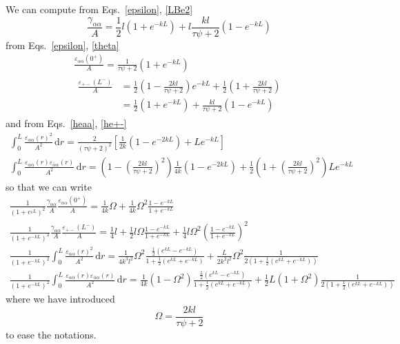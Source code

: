 \documentclass[pre,aps,superscriptaddress,nofootinbib]{revtex4}
\begin{document}
We can compute from Eqs.~\ref{epsilon}, \ref{LBe2}
\begin{equation}
\frac{\gamma_{\alpha\alpha}}{A} = \frac{1}{2} l (1 + e^{-k L}) + l \frac{kl}{\tau\psi + 2} (1 - e^{-kL})
\end{equation}
from Eqs.~\ref{epsilon}, \ref{theta}
\begin{eqnarray}
\frac{\varepsilon_{\alpha\alpha}(0^+)}{A} = \frac{1}{\tau\psi + 2}(1 + e^{-k L})\\
\begin{aligned}
\frac{\varepsilon_{+-}(L^-)}{A} &= \frac{1}{2} \left(1 - \frac{2 k l}{\tau \psi + 2}\right)e^{-k L} + \frac{1}{2} \left(1 + \frac{2 k l}{\tau \psi + 2}\right)\\
&= \frac{1}{2} (1 + e^{-k L}) + \frac{k l}{\tau \psi + 2} (1 - e^{- k L})
\end{aligned}
\end{eqnarray}
and from Eqs.~\ref{heaa}, \ref{he+-}
\begin{eqnarray}
\int_0^L \frac{\varepsilon_{\alpha\alpha}(r)^2}{A^2} \, \mathrm{d}r = \frac{2}{(\tau \psi + 2)^2} \left[\frac{1}{2k}(1 - e^{- 2 k L}) + L e^{-k L}\right]\\
\int_0^L \frac{\varepsilon_{\alpha\overline{\alpha}}(r)\varepsilon_{\overline{\alpha}\alpha}(r)}{A^2} \, \mathrm{d}r = \left(1 - \left(\frac{2 k l}{\tau \psi + 2}\right)^2\right) \frac{1}{4 k} (1 - e^{-2 k L}) + \frac{1}{2} \left(1 + \left(\frac{2 k l}{\tau \psi + 2}\right)^2\right) L e^{-k L}
\end{eqnarray}
so that we can write
\begin{eqnarray}
\frac{1}{(1 + e^{_k L})^2} \frac{\gamma_{\alpha\alpha}}{A} \frac{\varepsilon_{\alpha\alpha}(0^+)}{A} = \frac{1}{4 k} \Omega + \frac{1}{4 k} \Omega^2 \frac{1 - e^{-k L}}{1 + e^{-k L}}\\
\frac{1}{(1 + e^{-k L})^2} \frac{\gamma_{\alpha\alpha}}{A} \frac{\varepsilon_{+-}(L^-)}{A} = \frac{1}{4} l + \frac{1}{2} l \Omega \frac{1 - e^{-k L}}{1 + e^{-k L}} + \frac{1}{4} l \Omega^2 \left(\frac{1 - e^{-k L}}{1 + e^{-k L}}\right)^2\\
\frac{1}{(1 + e^{-k L})^2} \int_0^L \frac{\varepsilon_{\alpha\alpha}(r)^2}{A^2} \, \mathrm{d}r = \frac{1}{4 k^3 l^2} \Omega^2 \frac{\frac{1}{2}(e^{k L} - e^{-k L})}{1 + \frac{1}{2} (e^{k L} + e^{-k L})} + \frac{L}{2 k^2 l^2} \Omega^2 \frac{1}{2\left(1 + \frac{1}{2}(e^{k L} + e^{-k L})\right)}\\
\frac{1}{(1 + e^{-k L})^2} \int_0^L \frac{\varepsilon_{\alpha\overline{\alpha}}(r)\varepsilon_{\overline{\alpha}\alpha}(r)}{A^2} \, \mathrm{d}r = \frac{1}{4 k}(1 - \Omega^2) \frac{\frac{1}{2}(e^{k L} - e^{-k L})}{1 + \frac{1}{2}(e^{k L} + e^{-k L})} + \frac{1}{2} L (1 + \Omega^2) \frac{1}{2\left(1 + \frac{1}{2}(e^{k L} + e^{-k L})\right)}
\end{eqnarray}
where we have introduced
\begin{equation}
\Omega = \frac{2 k l}{\tau \psi + 2}
\end{equation}
to ease the notations.\\
\end{document}
